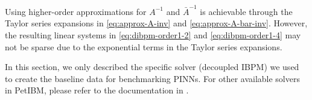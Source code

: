 Using higher-order approximations for $A^{-1}$ and $\bar{A}^{-1}$ is achievable through the Taylor series expansions in \eqref{eq:approx-A-inv} and \eqref{eq:approx-A-bar-inv}.
However, the resulting linear systems in \eqref{eq:dibpm-order1-2} and \eqref{eq:dibpm-order1-4} may not be sparse due to the exponential terms in the Taylor series expansions.

In this section, we only described the specific solver (decoupled IBPM) we used to create the baseline data for benchmarking PINNs.
For other available solvers in PetIBM, please refer to the documentation in \cite{chuang_petibm:_2018}.
